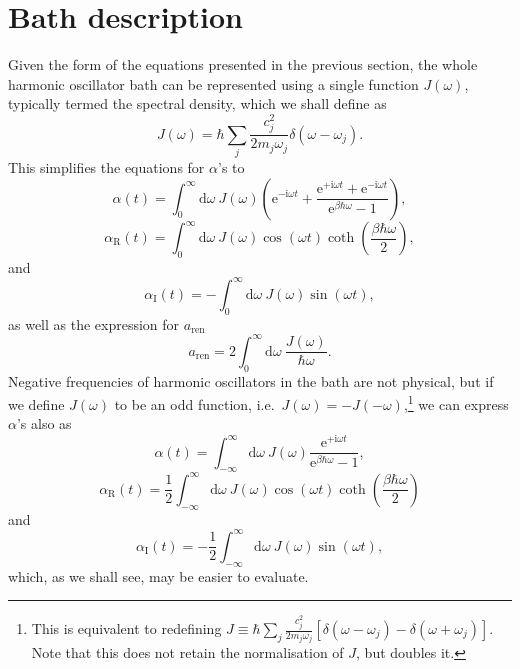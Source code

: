 \section{Bath description}
Given the form of the equations presented in the previous section, the whole harmonic oscillator bath can be represented using a single function $J(\omega)$, typically termed the spectral density, which we shall define as
\begin{equation}
	J(\omega) = \hbar \sum_j \frac{c_j^2}{2m_j \omega_j}\delta(\omega-\omega_j).
\end{equation}
This simplifies the equations for $\alpha$'s to
\begin{equation}
\alpha(t) = \int_{0}^{\infty}\mathrm{d}\omega\ J(\omega)\left(\mathrm{e}^{-\mathrm{i}\omega t} + \frac{\mathrm{e}^{+\mathrm{i}\omega t}+\mathrm{e}^{-\mathrm{i}\omega t}}{\mathrm{e}^{\beta\hbar\omega}-1}\right),
\end{equation}
\begin{equation}
\alpha_\mathrm{R}(t) = \int_{0}^{\infty}\mathrm{d}\omega\ J(\omega)\cos(\omega t) \coth\left(\frac{\beta\hbar\omega}{2}\right),
\end{equation}
and
\begin{equation}
\alpha_\mathrm{I}(t) = - \int_{0}^{\infty}\mathrm{d}\omega\ J(\omega) \sin(\omega t),
\end{equation}
as well as the expression for $a_\mathrm{ren}$
\begin{equation}
a_\mathrm{ren} = 2\int_{0}^{\infty}\mathrm{d}\omega\ \frac{J(\omega)}{\hbar\omega}.
\label{eq:aren}
\end{equation}
Negative frequencies of harmonic oscillators in the bath are not physical, but if we define $J(\omega)$ to be an odd function, i.e.~$J(\omega) = -J(-\omega)$,\footnote[3]{This is equivalent to redefining $J\equiv \hbar \sum_j \frac{c_j^2}{2m_j \omega_j}[\delta(\omega-\omega_j)-\delta(\omega+\omega_j)]$. Note that this does not retain the normalisation of $J$, but doubles it.} we can express $\alpha$'s also as
\begin{equation}
\alpha(t) = \int_{-\infty}^{\infty}\mathrm{d}\omega\ J(\omega)\frac{\mathrm{e}^{+\mathrm{i}\omega t}}{\mathrm{e}^{\beta\hbar\omega}-1},
\end{equation}
\begin{equation}
\alpha_\mathrm{R}(t) = \frac{1}{2}\int_{-\infty}^{\infty}\mathrm{d}\omega\ J(\omega)\cos(\omega t) \coth\left(\frac{\beta\hbar\omega}{2}\right)
\end{equation}
and
\begin{equation}
\alpha_\mathrm{I}(t) = - \frac{1}{2}\int_{-\infty}^{\infty}\mathrm{d}\omega\ J(\omega) \sin(\omega t),
\end{equation}
which, as we shall see, may be easier to evaluate.

